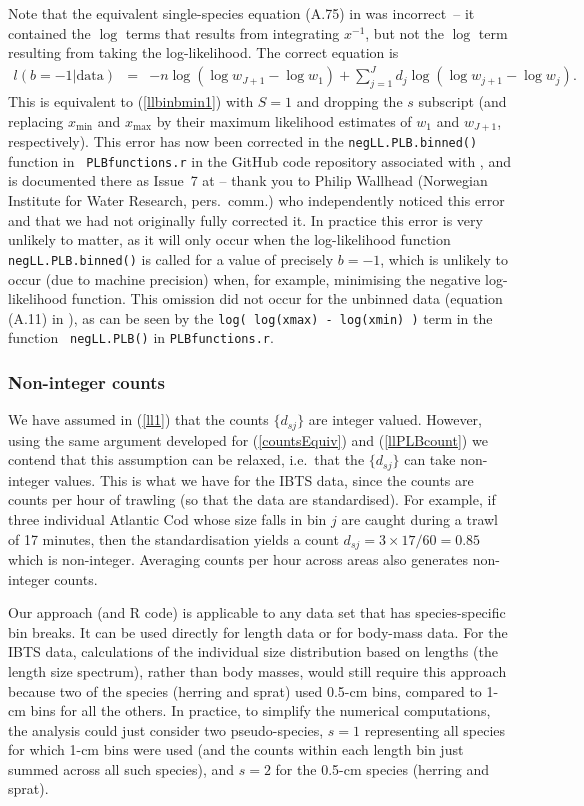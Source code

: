 \documentclass[12pt, letter]{article}
\newcommand{\eb}{\begin{eqnarray}}
\newcommand{\ee}{\end{eqnarray}}
\newcommand{\xmin}{x_{\mathrm{min}}}
\newcommand{\xmax}{x_{\mathrm{max}}}
\newcommand{\MEE}{erpbb17}     %
\begin{document}
Note that the equivalent single-species equation (A.75) in \citet{\MEE} was
incorrect~-- it contained the $\log$ terms that results from integrating
$x^{-1}$, but not the $\log$ term resulting from taking the log-likelihood. The
correct equation is \eb l(b = -1 | \mbox{data}) & = & - n \log (\log w_{J +1} -
\log w_{1}) + \sum_{j=1}^{J} d_{j} \log ( \log w_{j+1} - \log
w_{j}).\label{llMEEcorrected} \ee This is equivalent to (\ref{llbinbmin1}) with
$S=1$ and dropping the $s$ subscript (and replacing $\xmin$ and $\xmax$ by their
maximum likelihood estimates of $w_{1}$ and $w_{J+1}$, respectively). This error
has now been corrected in the {\tt negLL.PLB.binned()} function in {\tt
  PLBfunctions.r} in the GitHub code repository associated with \citet{\MEE},
and is documented there as Issue~7 at {} --
thank you to Philip Wallhead (Norwegian Institute for Water Research,
pers.~comm.) who
independently noticed this error and that we had not originally fully corrected it.
In practice
this error is very unlikely to matter, as it will only occur when the
log-likelihood function {\tt negLL.PLB.binned()} is called for a value of
precisely $b=-1$, which is unlikely to occur (due to machine precision) when,
for example, minimising the negative log-likelihood function. This omission did
not occur for the unbinned data (equation (A.11) in \citealt{\MEE}), as can be
seen by the {\tt log( log(xmax) - log(xmin) )} term in the function {\tt
  negLL.PLB()} in {\tt PLBfunctions.r}.

\subsubsection{Non-integer counts}

We have assumed in (\ref{ll1}) that the counts $\{d_{sj}\}$ are integer
valued. However, using the same argument developed for (\ref{countsEquiv}) and
(\ref{llPLBcount}) we contend that this assumption can be relaxed, i.e.~that the
$\{d_{sj}\}$ can take non-integer values. This is what we have for the IBTS
data, since the counts are counts per hour of trawling (so that the data are
standardised). For example, if three individual Atlantic Cod whose size falls in
bin $j$ are caught during a trawl of 17 minutes, then the standardisation yields
a count $d_{sj} = 3 \times 17/60 = 0.85$ which is non-integer. Averaging counts
per hour across areas also generates non-integer counts.

Our approach (and R code) is applicable to any data
set that has species-specific bin breaks. It can be used directly for length
data or for body-mass data. For the IBTS data, calculations of the individual
size distribution based on lengths (the length size spectrum), rather than body
masses, would still require this approach because two of the species (herring and
sprat) used 0.5-cm bins, compared to 1-cm bins for all the others. In practice,
to simplify the numerical computations, the analysis could just consider two
pseudo-species, $s=1$ representing all species for which 1-cm bins were used
(and the counts within each length bin just summed across all such species), and
$s=2$ for the 0.5-cm species (herring and sprat).
\end{document}
